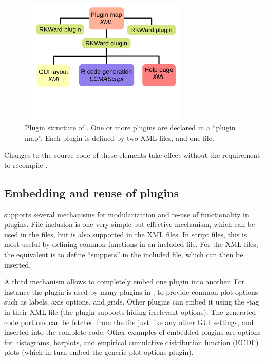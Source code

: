 \documentclass[article,shortnames]{jss}
\begin{document}
\begin{figure}[t!]
 \centering
 \includegraphics[clip=true,trim=0cm 6cm 0cm 0cm,width=8cm]{plugin_structure.pdf}
 \caption{Plugin structure of . One or more plugins are declared in a ``plugin map''. Each plugin is defined by
 two XML files, and one  file.}
 \label{fig:plugin_structure}
\end{figure}

Changes to the source code of these elements take effect without the requirement to recompile .

\subsection{Embedding and reuse of plugins}
\label{sec:technical_plugins_embedding}
 supports several mechanisms for modularization and re-use of
functionality in plugins. File inclusion is one very simple but effective
mechanism, which can be used in the  files, but is also supported in
the XML files. In script files, this is most useful by defining common functions
in an included file. For the XML files, the equivalent is to define ``snippets''
in the included file, which can then be inserted.

A third mechanism allows to completely embed one plugin into another. For
instance the  plugin is used by many plugins in , to provide
common plot options such as labels, axis options, and grids. Other plugins
can embed it using the -tag in their XML file (the plugin supports
hiding irrelevant options). The generated code portions can be fetched from the
 file just like any other GUI settings, and inserted into the complete
code. Other examples of embedded plugins are options for histograms, barplots,
and empirical cumulative distribution function (ECDF) plots (which in turn embed the generic plot options plugin).
\end{document}
